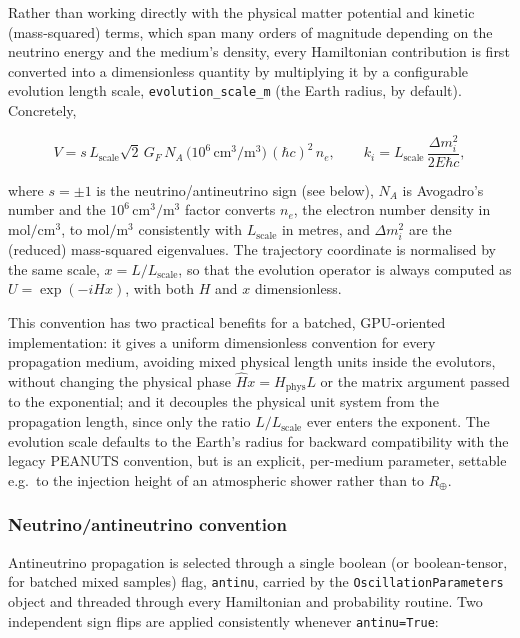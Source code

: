 Rather than working directly with the physical matter potential and kinetic (mass-squared) terms, which span many orders of magnitude depending on the neutrino energy and the medium's density, every Hamiltonian contribution is first converted into a dimensionless quantity by multiplying it by a configurable evolution length scale, \texttt{evolution\_scale\_m} (the Earth radius, by default). Concretely,

\begin{equation}
  V = s\,L_{\mathrm{scale}}\sqrt{2}\,G_F\,N_A\,\bigl(10^{6}\,\mathrm{cm^3/m^3}\bigr)\,(\hbar c)^2\,n_e,
  \qquad
  k_i = L_{\mathrm{scale}}\,\frac{\Delta m_i^2}{2E\hbar c},
\end{equation}

where \(s=\pm1\) is the neutrino/antineutrino sign (see below), \(N_A\) is Avogadro's number and the \(10^6\,\mathrm{cm^3/m^3}\) factor converts \(n_e\), the electron number density in \(\mathrm{mol/cm^3}\), to \(\mathrm{mol/m^3}\) consistently with \(L_{\mathrm{scale}}\) in metres, and \(\Delta m_i^2\) are the (reduced) mass-squared eigenvalues. The trajectory coordinate is normalised by the same scale, \(x=L/L_{\mathrm{scale}}\), so that the evolution operator is always computed as \(U=\exp(-iHx)\), with both \(H\) and \(x\) dimensionless.

This convention has two practical benefits for a batched, GPU-oriented implementation: it gives a uniform dimensionless convention for every propagation medium, avoiding mixed physical length units inside the evolutors, without changing the physical phase \(\hat Hx=H_{\mathrm{phys}}L\) or the matrix argument passed to the exponential; and it decouples the physical unit system from the propagation length, since only the ratio \(L/L_{\mathrm{scale}}\) ever enters the exponent. The evolution scale defaults to the Earth's radius for backward compatibility with the legacy PEANUTS convention, but is an explicit, per-medium parameter, settable e.g.\ to the injection height of an atmospheric shower rather than to \(R_\oplus\).

\subsubsection{Neutrino/antineutrino convention}
\label{sec:antinu-convention}

Antineutrino propagation is selected through a single boolean (or boolean-tensor, for batched mixed samples) flag, \texttt{antinu}, carried by the \texttt{OscillationParameters} object and threaded through every Hamiltonian and probability routine. Two independent sign flips are applied consistently whenever \texttt{antinu=True}:


